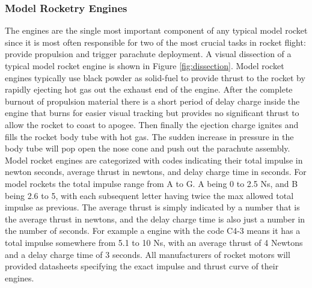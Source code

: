 \documentclass{workreport}
\begin{document}
\begin{body}
\subsubsection{Model Rocketry Engines}

	The engines are the single most important component of any typical model rocket since it is most often responsible for two of the most crucial tasks in rocket flight: provide propulsion and trigger parachute deployment. A visual dissection of a typical model rocket engine is shown in Figure \ref{fig:dissection}. Model rocket engines typically use black powder as solid-fuel to provide thrust to the rocket by rapidly ejecting hot gas out the exhaust end of the engine. After the complete burnout of propulsion material there is a short period of delay charge inside the engine that burns for easier visual tracking but provides no significant thrust to allow the rocket to coast to apogee. Then finally the ejection charge ignites and fills the rocket body tube with hot gas. The sudden increase in pressure in the body tube will pop open the nose cone and push out the parachute assembly. Model rocket engines are categorized with codes indicating their total impulse in newton seconds, average thrust in newtons, and delay charge time in seconds. For model rockets the total impulse range from A to G. A being 0 to 2.5 Ns, and B being 2.6 to 5, with each subsequent letter having twice the max allowed total impulse as previous. The average thrust is simply indicated by a number that is the average thrust in newtons, and the delay charge time is also just a number in the number of seconds.
	For example a engine with the code C4-3 means it has a total impulse somewhere from 5.1 to 10 Ns, with an average thrust of 4 Newtons and a delay charge time of 3 seconds. All manufacturers of rocket motors will provided datasheets specifying the exact impulse and thrust curve of their engines.


\end{body}
\end{document}
